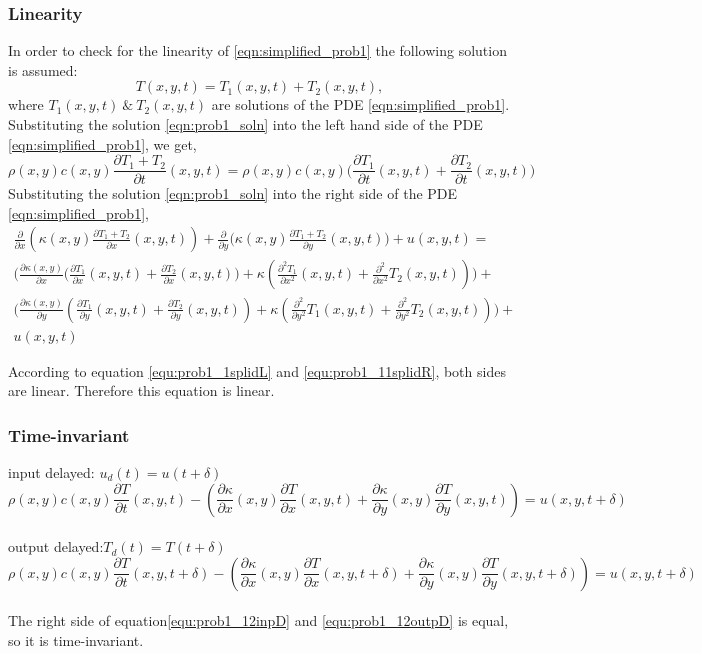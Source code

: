 \documentclass[12pt]{article}
\newcommand{\parder}[2]{\frac{\partial #1}{\partial #2}}
\begin{document}
\subsubsection*{Linearity}
In order to check for the linearity of \eqref{eqn:simplified_prob1} the following solution is assumed:
\begin{equation}
T(x,y,t) = T_1(x,y,t) + T_2(x,y,t),
\label{eqn:prob1_soln}
\end{equation}
where $T_1(x,y,t) \ \& \ T_2(x,y,t)$ are solutions of the PDE \eqref{eqn:simplified_prob1}.
Substituting the solution \eqref{eqn:prob1_soln} into the left hand side of the PDE \eqref{eqn:simplified_prob1}, we get,
\begin{equation}
\rho(x,y)c(x,y) \parder{T_1 + T_2}{t} (x,y,t) =\rho(x,y)c(x,y)\bigg( \parder{T_1}{t} (x,y,t)+\parder{T_2}{t} (x,y,t)\bigg)
\label{equ:prob1_1splidL}
\end{equation}
Substituting the solution \eqref{eqn:prob1_soln} into the right side of the PDE \eqref{eqn:simplified_prob1},
\begin{multline}
\parder{ }{x}\left(\kappa(x,y)\parder{T_1 + T_2}{x} (x,y,t)\right) + \parder{ }{y}\bigg(\kappa(x,y)\parder{T_1 + T_2}{y} (x,y,t)\bigg)+u(x,y,t)=\\ 
\bigg(\parder{\kappa(x,y)}{x} \Big( \parder{T_1}{x} (x,y,t)+\parder{T_2}{x} (x,y,t)\Big)+ \kappa (\parder{^2  T_1}{x^2}(x,y,t)+\parder{^2}{x^2} T_2(x,y,t))\bigg)+\\ \bigg(\parder{\kappa(x,y)}{y}( \parder{T_1}{y} (x,y,t)+\parder{T_2}{y} (x,y,t))+ \kappa (\parder{^2}{y^2} T_1(x,y,t)+\parder{^2}{y^2} T_2(x,y,t))\bigg)+\\ u(x,y,t)
\label{equ:prob1_11splidR}
\end{multline}

According to equation \eqref{equ:prob1_1splidL} and \eqref{equ:prob1_11splidR}, both sides are linear. Therefore this equation is linear.

\subsubsection*{Time-invariant}
input delayed: $u_d(t)=u(t+\delta)$\\
\begin{equation}
\rho (x,y)c(x,y)\frac {\partial T} {\partial t}(x,y,t)-(\frac {\partial \kappa} {\partial x}(x,y) \frac {\partial T} {\partial x}(x,y,t)+\frac {\partial \kappa} {\partial y}(x,y) \frac {\partial T} {\partial y}(x,y,t))=u(x,y,t+\delta)
\label{equ:prob1_12inpD}
\end{equation}\\
output delayed:$T_d(t)=T(t+\delta)$\\
\begin{equation}
\rho (x,y)c(x,y)\frac {\partial T} {\partial t}(x,y,t+\delta)-(\frac {\partial \kappa} {\partial x}(x,y) \frac {\partial T} {\partial x}(x,y,t+\delta)+\frac {\partial \kappa} {\partial y}(x,y) \frac {\partial T} {\partial y}(x,y,t+\delta))=u(x,y,t+\delta)
\label{equ:prob1_12outpD}
\end{equation}\\
The right side of equation\eqref{equ:prob1_12inpD} and \eqref{equ:prob1_12outpD} is equal, so it is time-invariant.
\end{document}
